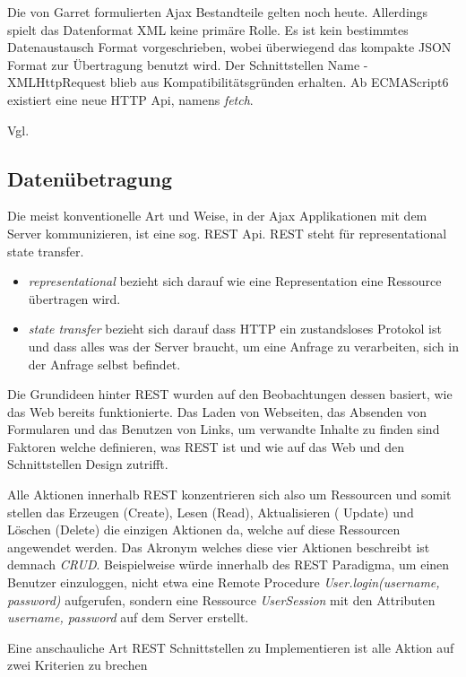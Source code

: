 Die von Garret formulierten Ajax Bestandteile gelten noch heute. Allerdings spielt das Datenformat XML keine primäre Rolle. Es ist kein bestimmtes Datenaustausch Format vorgeschrieben, wobei überwiegend das kompakte JSON Format zur Übertragung benutzt wird. Der Schnittstellen Name - XMLHttpRequest blieb aus Kompatibilitätsgründen erhalten. Ab ECMAScript6 existiert eine neue HTTP Api, namens \emph{fetch}.

Vgl. \cite{Garrett:2005}

\subsection{Datenübetragung}

Die meist konventionelle Art und Weise, in der Ajax Applikationen mit dem Server kommunizieren, ist eine sog. REST Api. REST steht für representational state transfer.    

\begin{itemize} 
\item \emph{representational} bezieht sich darauf wie eine Representation eine Ressource übertragen wird.
\item \emph{state transfer} bezieht sich darauf dass HTTP ein zustandsloses Protokol ist und dass alles was der Server braucht, um eine Anfrage zu verarbeiten, sich in der Anfrage selbst befindet.
\end{itemize}

Die Grundideen hinter REST wurden auf den Beobachtungen dessen basiert, wie das Web bereits funktionierte. Das Laden von Webseiten, das Absenden von Formularen und das Benutzen von Links, um verwandte Inhalte zu finden sind Faktoren welche definieren, was REST ist und wie auf das Web und den Schnittstellen Design zutrifft. 

Alle Aktionen innerhalb REST konzentrieren sich also um Ressourcen und somit stellen das Erzeugen (Create), Lesen (Read), Aktualisieren ( Update) und Löschen (Delete) die einzigen Aktionen da, welche auf diese Ressourcen angewendet werden. Das Akronym welches diese vier Aktionen beschreibt ist demnach \emph{CRUD}. Beispielweise würde innerhalb des REST Paradigma, um einen Benutzer einzuloggen, nicht etwa eine Remote Procedure \emph{User.login(username, password)} aufgerufen, sondern eine Ressource \emph{UserSession} mit den Attributen \emph{username, password} auf dem Server erstellt.

Eine anschauliche Art REST Schnittstellen zu Implementieren ist alle Aktion auf zwei Kriterien zu brechen 

